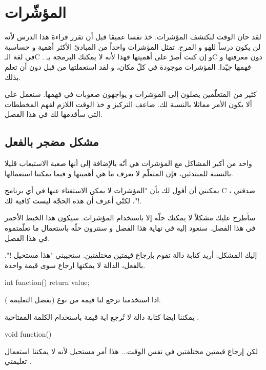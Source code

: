 \chapter{المؤشّرات}
لقد حان الوقت لنكتشف المؤشرات. خذ نفسا عميقا قبل أن تقرر قراءة هذا الدرس لأنه لن يكون درساً للهو و المرح. تمثل المؤشرات واحداً من المبادئ الأكثر أهمية و حساسية في لغة الـ\textenglish{C}
. و إن كنت أصرّ على أهميتها فهذا  لأنه لا يمكنك البرمجة بـ\textenglish{C}
دون معرفتها و فهمها جيّدا. المؤشرات موجودة في كلّ مكان، و لقد استعملتها من قبل دون أن تعلم بذلك.

كثير من المتعلّمين يصلون إلى المؤشرات و يواجهون صعوبات في فهمها. سنعمل على ألا يكون الأمر مماثلا بالنسبة لك. ضاعف التركيز و خذ الوقت اللازم لفهم المخططات التي سأقدمها لك في هذا الفصل.

\section{مشكل مضجر بالفعل}
واحد من أكبر المشاكل مع المؤشرات هي أنّه بالإضافة إلى أنها صعبة الاستيعاب قليلا بالنسبة للمبتدئين، فإن المتعلّم لا يعرف ما هي أهميتها و فيما يمكننا استعمالها.

يمكنني أن أقول لك بأن "المؤشرات لا يمكن الاستغناء عنها في أي برنامج
\textenglish{C}
، صدقني !"، لكنّي أعرف أن هذه الحجّة ليست كافية لك.

سأطرح عليك مشكلاً لا يمكنك حلّه إلا باستخدام المؤشرات. سيكون هذا الخيط الأحمر في هذا الفصل. سنعود إليه في نهاية هذا الفصل و سنترون حلّه باستعمال ما تعلّمتموه في هذا الفصل.

إليك المشكل: أريد كتابة دالة تقوم بإرجاع قيمتين مختلفتين. ستجيبني "هذا مستحيل !". بالفعل، الدالة لا يمكنها ارجاع سوى قيمة واحدة.
\begin{Csource}
int function()
{
	return value;
}
\end{Csource}
اذا استخدمنا
ترجع لنا قيمة من نوع
(بفضل التعليمة
).

يمكننا ايضا كتابة دالة لا تُرجع اية قيمة باستخدام الكلمة المفتاحية
.
\begin{Csource}
void function()
{

}
\end{Csource}
لكن إرجاع قيمتين مختلفتين في نفس الوقت... هذا أمر مستحيل لأنه لا يمكننا استعمال تعليمتي
.

